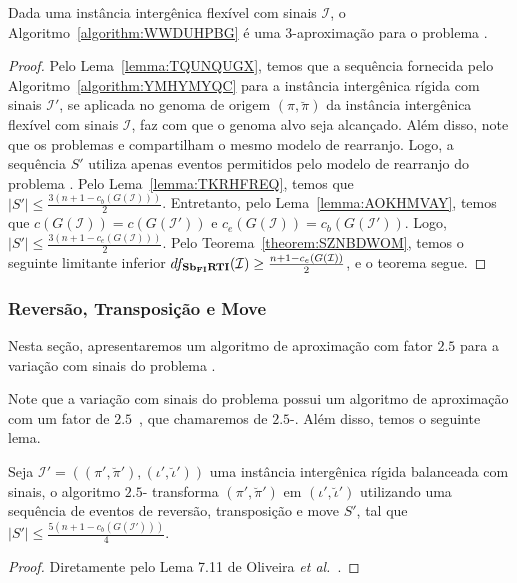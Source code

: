 \begin{theorem}\label{theorem:IRGQGPKZ}
Dada uma instância intergênica flexível com sinais $\mathcal{I}$, o Algoritmo~\ref{algorithm:WWDUHPBG} é uma $3$-aproximação para o problema \SbFIRTI{}.
\end{theorem}
\begin{proof}
Pelo Lema~\ref{lemma:TQUNQUGX}, temos que a sequência fornecida pelo Algoritmo~\ref{algorithm:YMHYMYQC} para a instância intergênica rígida com sinais $\mathcal{I'}$, se aplicada no genoma de origem $(\pi,\breve\pi)$ da instância intergênica flexível com sinais $\mathcal{I}$, faz com que o genoma alvo seja alcançado. Além disso, note que os problemas \SbIRTI{} e \SbFIRTI{} compartilham o mesmo modelo de rearranjo. Logo, a sequência $S'$ utiliza apenas eventos permitidos pelo modelo de rearranjo do problema \SbFIRTI{}. Pelo Lema~\ref{lemma:TKRHFREQ}, temos que $|S'| \le \frac{3(n+1 - c_b(G(\mathcal{I})))}{2}$. Entretanto, pelo Lema~\ref{lemma:AOKHMVAY}, temos que $c(G(\mathcal{I})) = c(G(\mathcal{I}'))$ e $c_e(G(\mathcal{I})) = c_b(G(\mathcal{I}'))$. Logo, $|S'| \le \frac{3(n+1 - c_e(G(\mathcal{I})))}{2}$. Pelo Teorema~\ref{theorem:SZNBDWOM}, temos o seguinte limitante inferior $df_{\textbf{Sb\textsubscript{FI}RTI}}(\mathcal{I}) \ge \frac{n+1 - c_e(G(\mathcal{I}))}{2}$, e o teorema segue.
\end{proof}

\subsubsection{Reversão, Transposição e Move}

Nesta seção, apresentaremos um algoritmo de aproximação com fator $2.5$ para a variação com sinais do problema \SbFIRTM{}. 

Note que a variação com sinais do problema \SbIRTM{} possui um algoritmo de aproximação com um fator de $2.5$~\cite{2021a-oliveira-etal}, que chamaremos de $2.5$-\SbIRTM{}. Além disso, temos o seguinte lema.

\begin{lemma}\label{lemma:TPROVWMO}
Seja $\mathcal{I}' = ((\pi',\breve\pi'),(\iota',\breve\iota'))$ uma instância intergênica rígida balanceada com sinais, o algoritmo $2.5$-\SbIRTM{} transforma $(\pi',\breve\pi')$ em $(\iota',\breve\iota')$ utilizando uma sequência de eventos de reversão, transposição e move $S'$, tal que $|S'| \le \frac{5({n+1} - c_b(G(\mathcal{I}')))}{4}$.
\end{lemma}
\begin{proof}
Diretamente pelo Lema 7.11 de Oliveira \textit{et al.}~\cite{2021a-oliveira-etal}.
\end{proof}

